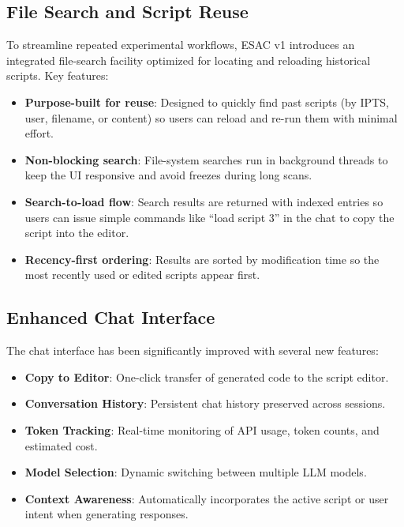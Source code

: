 \documentclass[tm]{ornltm} %
\begin{document}
\subsection{File Search and Script Reuse}
\label{subsec:file_search}

To streamline repeated experimental workflows, ESAC v1 introduces an integrated file-search facility optimized for locating and reloading historical scripts. Key features:

\begin{itemize}
  \item \textbf{Purpose-built for reuse}: Designed to quickly find past scripts (by IPTS, user, filename, or content) so users can reload and re-run them with minimal effort.
  \item \textbf{Non-blocking search}: File-system searches run in background threads to keep the UI responsive and avoid freezes during long scans.
  \item \textbf{Search-to-load flow}: Search results are returned with indexed entries so users can issue simple commands like ``load script 3'' in the chat to copy the script into the editor.
  \item \textbf{Recency-first ordering}: Results are sorted by modification time so the most recently used or edited scripts appear first.
\end{itemize}

\subsection{Enhanced Chat Interface}
\label{subsec:chat_interface}

The chat interface has been significantly improved with several new features:

\begin{itemize}
  \item \textbf{Copy to Editor}: One-click transfer of generated code to the script editor.
  \item \textbf{Conversation History}: Persistent chat history preserved across sessions.
  \item \textbf{Token Tracking}: Real-time monitoring of API usage, token counts, and estimated cost.
  \item \textbf{Model Selection}: Dynamic switching between multiple LLM models.
  \item \textbf{Context Awareness}: Automatically incorporates the active script or user intent when generating responses.
\end{itemize}
\end{document}
